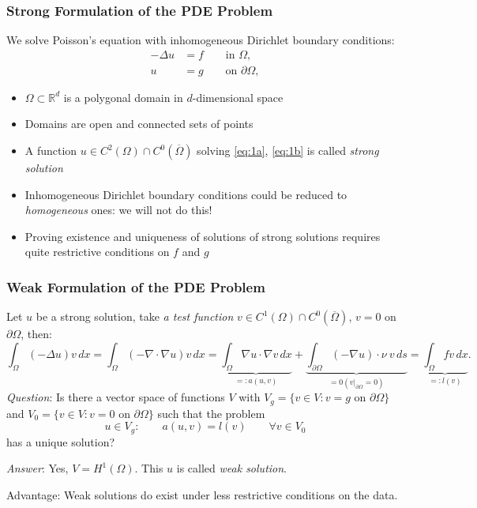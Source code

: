 \documentclass[aspectratio=169,11pt]{beamer}
\theoremstyle{definition}
\begin{document}
\begin{frame}
\frametitle{Strong Formulation of the PDE Problem}
We solve Poisson's equation with inhomogeneous Dirichlet boundary conditions:
\begin{subequations}
\begin{align}
-\Delta u & = f \qquad\text{in $\Omega$},\label{eq:1a}\\
u &= g \qquad\text{on $\partial\Omega$},\label{eq:1b}
\end{align}
\end{subequations}
\begin{itemize}
\item $\Omega\subset\mathbb{R}^d$ is a polygonal domain in $d$-dimensional space
\item Domains are open and connected sets of points
\item A function $u\in C^2(\Omega)\cap C^0(\overline\Omega)$ solving \eqref{eq:1a}, \eqref{eq:1b}
is called {\em strong solution}
\item Inhomogeneous Dirichlet boundary conditions could be
reduced to {\em homogeneous} ones: we will not do this!
\item Proving existence and uniqueness of solutions of strong solutions
requires quite restrictive conditions on $f$ and $g$
\end{itemize}
\end{frame}

\begin{frame}
\frametitle{Weak Formulation of the PDE Problem}

Let $u$ be a strong solution, take  {\em a test function}
$v\in C^1(\Omega)\cap C^0(\overline\Omega)$, $v=0$ on $\partial\Omega$, then:
\begin{equation*}
\int_\Omega (-\Delta u) v \,dx = \int_\Omega (-\nabla \cdot \nabla u) v \,dx =
\underbrace{\int_\Omega \nabla u \cdot \nabla v \,dx}_{=: a(u,v)}
+ \underbrace{\int_{\partial\Omega} (-\nabla u)\cdot \nu \ v \,ds }_{= 0 (v|_{\partial\Omega}=0)}
= \underbrace{\int_\Omega fv \,dx}_{=: l(v)}.
\end{equation*}
{\em Question}:  Is there a vector space of functions $V$ with $V_g=\{v\in V :
\text{$v=g$ on $\partial\Omega$}\}$ and $V_0=\{v\in V :
\text{$v=0$ on $\partial\Omega$}\}$ such that
the problem
\begin{equation}
u \in V_g :\qquad a(u,v) = l(v) \qquad \forall v\in V_0 \label{eq:weakform}
\end{equation}
has a unique solution?

{\em Answer}: Yes, $V=H^1(\Omega)$. This $u$ is called {\em weak solution}.

Advantage: Weak solutions do exist under less restrictive conditions on the data.
\end{frame}
\end{document}

